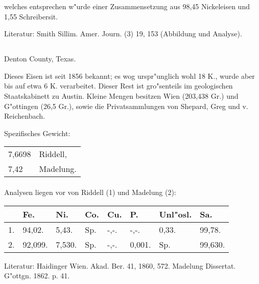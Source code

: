\documentclass[a4paper, 11pt, oneside]{article}
\begin{document}
welches entsprechen w"urde einer Zusammensetzung aus 98,45 Nickeleisen und 1,55 Schreibersit.

\normalsize
Literatur: Smith Sillim. Amer. Journ. (3) 19, 153 (Abbildung und Analyse).

\subsection{}
\LARGE
\paragraph{}
Denton County, Texas.

Dieses Eisen ist seit 1856 bekannt; es wog urspr"unglich wohl 18 K., wurde aber bis auf etwa 6 K. verarbeitet. Dieser Rest ist gro"senteils im geologischen Staatskabinett zu Austin. Kleine Mengen besitzen Wien (203,438 Gr.) und G"ottingen (26,5 Gr.), sowie die Privatsammlungen von Shepard, Greg und v. Reichenbach.

Spezifisches Gewicht:  
\begin{table}[!ht]
    \centering\swabfamily\Large
    \begin{tabular}{l l}
        7,6698 & Riddell,\\
        7,42 & Madelung.
    \end{tabular}
\end{table}
\paragraph{}
Analysen liegen vor von Riddell (1) und Madelung (2):
\begin{table}[H]
    \centering\swabfamily\Large
    \begin{tabular}{l l l l l l l l}
         & Fe. & Ni. & Co. & Cu. & P. & Unl"osl. & Sa. \\ \hline
        1. & 94,02. & 5,43. & Sp. & -,-. & -,-. & 0,33. & 99,78. \\
        2. & 92,099. & 7,530. & Sp. & -,-. & 0,001. & Sp. & 99,630. \\
    \end{tabular}
\end{table}

\normalsize
Literatur: Haidinger Wien. Akad. Ber. 41, 1860, 572. Madelung Dissertat. G"ottgn. 1862. p. 41.

\subsection{}
\LARGE
\end{document}
